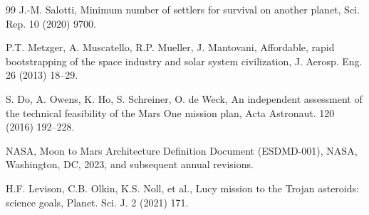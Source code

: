 \documentclass[preprint,12pt]{elsarticle}
\theoremstyle{definition}
\begin{document}
\begin{thebibliography}{99}
 J.-M. Salotti, Minimum number of settlers for survival on another planet, Sci. Rep. 10 (2020) 9700.

 P.T. Metzger, A. Muscatello, R.P. Mueller, J. Mantovani, Affordable, rapid bootstrapping of the space industry and solar system civilization, J. Aerosp. Eng. 26 (2013) 18--29.

 S. Do, A. Owens, K. Ho, S. Schreiner, O. de Weck, An independent assessment of the technical feasibility of the Mars One mission plan, Acta Astronaut. 120 (2016) 192--228.

 NASA, Moon to Mars Architecture Definition Document (ESDMD-001), NASA, Washington, DC, 2023, and subsequent annual revisions.

 H.F. Levison, C.B. Olkin, K.S. Noll, et al., Lucy mission to the Trojan asteroids: science goals, Planet. Sci. J. 2 (2021) 171.

\end{thebibliography}
\end{document}

